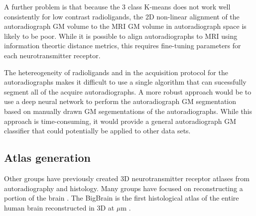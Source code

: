 \documentclass[12pt]{article}
\begin{document}
A further problem is that because the 3 class K-means does not work well consistently for low contrast radioligands, the 2D non-linear alignment of the autoradiograph GM volume to the MRI GM volume in autoradiograph space is likely to be poor. While it is possible to align autoradiographs to MRI using information theortic distance metrics, this requires fine-tuning parameters for each neurotransmitter receptor. 

The hetereogeneity of radioligands and in the acquisition protocol for the autoradiographs makes it difficult to use a single algorithm that can sucessfully segment all of the acquire autoradiographs. A more robust approach would be to use a deep neural network to perform the autoradiograph GM segmentation based on manually drawn GM segementations of the autoradiographs. While this approach is time-consuming, it would provide a general autoradiograph GM classifier that could potentially be applied to other data sets. 


\subsection{Atlas generation}
Other groups have previously created 3D neurotransmitter receptor atlases from autoradiography and histology. Many groups have focused on reconstructing a portion of the brain \cite{Chakravarty2006,Krauth2010,Xie2017,Iglesias2018a,Ewert2018,Sadikot2011}. The BigBrain is the first histological atlas of the entire human brain reconstructed in 3D at $\mu$m \cite{Amunts2013}. 





\end{document}
